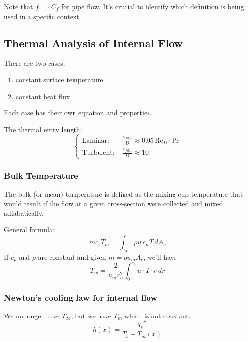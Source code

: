 Note that $f = 4C_f$ for pipe flow. It's crucial to identify which definition is being used in a specific context.
\subsection*{Thermal Analysis of Internal Flow}
There are two cases:
\begin{enumerate}
    \item constant surface temperature
    \item constant heat flux
\end{enumerate}
%
Each case has their own equation and properties.
%
\begin{definition}
The thermal entry length:
    \[
        \left\{\begin{array}{ll}
             \text{Laminar: }&  \frac{x_{fd,t}}{D} \approx 0.05\,\text{Re}_D\cdot\text{Pr}
             \\[1.5em]
             \text{Turbulent: }& \frac{x_{fd,t}}{D} \approx 10
        \end{array}
        \right.
    \]
\end{definition}

\subsubsection*{Bulk Temperature}
The bulk (or mean) temperature is defined as the mixing cup temperature that would result if the flow at a given cross-section were collected and mixed adiabatically.
\begin{definition}
General formula:
\[
        \dot{m} c_p T_m=\int_{A c} \rho u\, c_p \, T \,d A_c
\]  
%
If $c_p$ and $\rho$ are constant and given $\dot{m} = \rho u_m A_c$, we'll have
\[
    T_m=\frac{2}{u_m r_n^2} \int_0^{r_0} u\cdot T\cdot r\ d r
\]
\end{definition}

\subsubsection*{Newton's cooling law for internal flow}
We no longer have $T_\infty$, but we have $T_m$ which is not constant:
\[
    h(x) = \frac{q_s''}{T_s - T_m(x)}
\]
